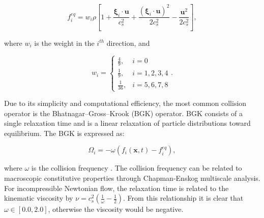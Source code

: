 \documentclass[pdftex,ms]{pittetd}
\newcommand{\pos}{\mathbf{x}}
\newcommand{\pvel}{\boldsymbol{\xi}}
\newcommand{\mvel}{\mathbf{u}}
\begin{document}
\begin{equation} \label{eq:feq}
f_i^{eq} = w_i \rho \left[1 + \frac{\pvel_i \cdot \mvel}{c_s^2} + \frac{(\pvel_i \cdot \mvel)^2}{2c_s^2} - \frac{\mvel^2}{2c_s^2} \right],
\end{equation}

\noindent where $w_i$ is the weight in the $i^{th}$ direction, and %

\begin{equation} \label{eq:weights}
w_i = \begin{cases}
    \frac{4}{9}, & i = 0 \\
    \frac{1}{9}, & i = 1, 2, 3, 4 \\
    \frac{1}{36}, & i = 5, 6, 7, 8
\end{cases}.
\end{equation}

Due to its simplicity and computational efficiency, the most common collision operator is the Bhatnagar--Gross--Krook (BGK) operator.
BGK consists of a single relaxation time and is a linear relaxation of particle distributions toward equilibrium.
The BGK is expressed as:

\begin{equation} \label{eq:bgk}
\Omega_i = -\omega (f_i(\pos, t) - f_i^{eq}),
\end{equation}

\noindent where $\omega$ is the collision frequency \cite{Bha54}.
The collision frequency can be related to macroscopic constitutive properties through Chapman-Enskog multiscale analysis.
For incompressible Newtonian flow, the relaxation time is related to the kinematic viscosity by $\nu = c_s^2(\frac{1}{\omega} - \frac{1}{2})$.
From this relationship it is clear that $\omega \in [0.0, 2.0]$, otherwise the viscosity would be negative.
\end{document}
